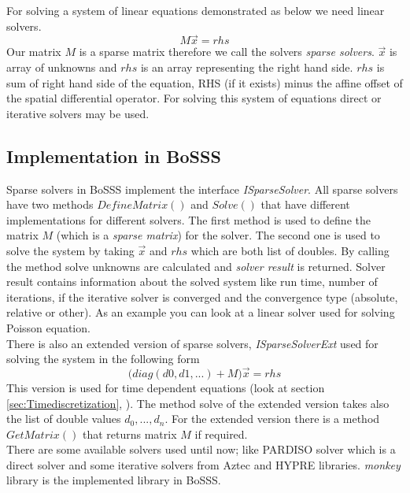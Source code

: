 \documentclass[BoSSSForSolvingConservationLaws.tex]{subfiles}
\begin{document}
For solving a system of linear equations demonstrated as below we need linear solvers.
\[
M \vec{x}= rhs
\]
Our matrix $M$ is a sparse matrix therefore we call the solvers \emph{sparse solvers}. $\vec{x}$ is array of unknowns and $rhs$ is an array representing the right hand side. $rhs$ is sum of right hand side of the equation, RHS (if it exists) minus the affine offset of the spatial differential operator. For solving this system of equations direct or iterative solvers may be used.

\subsection*{Implementation in BoSSS}
Sparse solvers in BoSSS implement the interface \emph{ISparseSolver}. All sparse solvers have two methods $DefineMatrix()$ and $Solve()$ that have different implementations for different solvers. The first method is used to define the matrix $M$ (which is a \emph{sparse matrix}) for the solver. The second one is used to solve the system by taking $\vec{x}$ and $rhs$ which are both list of doubles. By calling the method solve unknowns are calculated and \emph{solver result} is returned. Solver result  contains information about the solved system like run time, number of iterations, if the iterative solver is converged and the convergence type (absolute, relative or other). As an example you can look at a linear solver used for solving Poisson equation.\\
There is also an extended version of sparse solvers, \emph{ISparseSolverExt} used for solving the system in the following form
\[
\Big(diag(d0,d1,...)+M \Big) \vec{x}= rhs
\]
This version is used for time dependent equations (look at section \ref{sec:Timediscretization}, ). The method solve of the extended version takes also the list of double values $d_0,...,d_n$. For the extended version there is a method $GetMatrix()$ that returns matrix $M$ if required.\\
There are some available solvers used until now; like PARDISO solver which is a direct solver and some iterative solvers from Aztec and HYPRE libraries. \emph{monkey} library is the implemented library in BoSSS.
\end{document}
